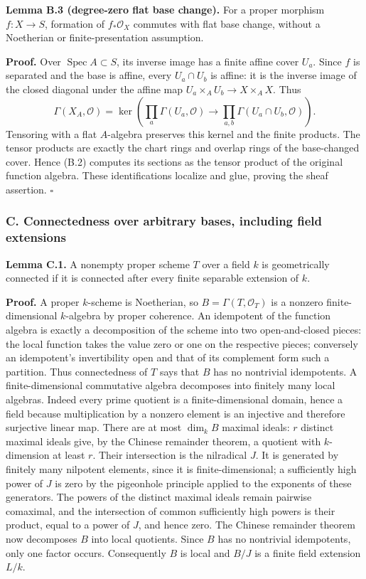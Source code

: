\documentclass[11pt]{article}
\begin{document}
\textbf{Lemma B.3 (degree-zero flat base change).} For a proper morphism
\(f:X\to S\), formation of \(f_*\mathcal O_X\) commutes with flat base
change, without a Noetherian or finite-presentation assumption.

\textbf{Proof.} Over \(\operatorname{Spec}A\subset S\), its inverse
image has a finite affine cover \(U_a\). Since \(f\) is separated and
the base is affine, every \(U_a\cap U_b\) is affine: it is the inverse
image of the closed diagonal under the affine map
\(U_a\times_AU_b\to X\times_AX\). Thus \[
\Gamma(X_A,\mathcal O)
=\ker\left(\prod_a\Gamma(U_a,\mathcal O)
\longrightarrow\prod_{a,b}\Gamma(U_a\cap U_b,\mathcal O)\right).
\tag{B.2}
\] Tensoring with a flat \(A\)-algebra preserves this kernel and the
finite products. The tensor products are exactly the chart rings and
overlap rings of the base-changed cover. Hence (B.2) computes its
sections as the tensor product of the original function algebra. These
identifications localize and glue, proving the sheaf assertion.
\(\square\)

\subsubsection{C. Connectedness over arbitrary bases, including field
extensions}\label{c.-connectedness-over-arbitrary-bases-including-field-extensions}

\textbf{Lemma C.1.} A nonempty proper scheme \(T\) over a field \(k\) is
geometrically connected if it is connected after every finite separable
extension of \(k\).

\textbf{Proof.} A proper \(k\)-scheme is Noetherian, so
\(B=\Gamma(T,\mathcal O_T)\) is a nonzero finite-dimensional
\(k\)-algebra by proper coherence. An idempotent of the function algebra
is exactly a decomposition of the scheme into two open-and-closed
pieces: the local function takes the value zero or one on the respective
pieces; conversely an idempotent's invertibility open and that of its
complement form such a partition. Thus connectedness of \(T\) says that
\(B\) has no nontrivial idempotents. A finite-dimensional commutative
algebra decomposes into finitely many local algebras. Indeed every prime
quotient is a finite-dimensional domain, hence a field because
multiplication by a nonzero element is an injective and therefore
surjective linear map. There are at most \(\dim_k B\) maximal ideals:
\(r\) distinct maximal ideals give, by the Chinese remainder theorem, a
quotient with \(k\)-dimension at least \(r\). Their intersection is the
nilradical \(J\). It is generated by finitely many nilpotent elements,
since it is finite-dimensional; a sufficiently high power of \(J\) is
zero by the pigeonhole principle applied to the exponents of these
generators. The powers of the distinct maximal ideals remain pairwise
comaximal, and the intersection of common sufficiently high powers is
their product, equal to a power of \(J\), and hence zero. The Chinese
remainder theorem now decomposes \(B\) into local quotients. Since \(B\)
has no nontrivial idempotents, only one factor occurs. Consequently
\(B\) is local and \(B/J\) is a finite field extension \(L/k\).
\end{document}
